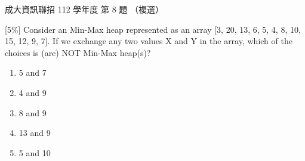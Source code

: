 \begin{pastexam}[label={px:ncku-112-prog-08}]{成大資訊聯招 112 學年度 第 8 題}
（複選）

{[5\%]} Consider an Min-Max heap represented as an array [3, 20, 13, 6, 5, 4, 8, 10, 15, 12, 9, 7]. If
we exchange any two values X and Y in the array, which of the choices is (are) NOT Min-Max heap(s)?
\begin{enumerate}[label=(\Alph*)]
\item 5 and 7
\item 4 and 9
\item 8 and 9
\item 13 and 9
\item 5 and 10
\end{enumerate}
\end{pastexam}

